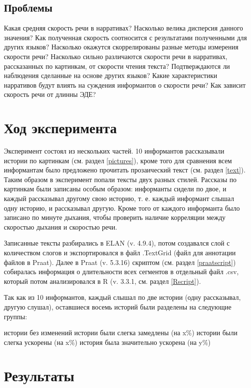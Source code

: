\subsection{Проблемы}
\begin{itemize}
\mytem Какая средняя скорость речи в нарративах? Насколько велика дисперсия данного значения? Как полученная скорость соотносится с результатами полученными для других языков?
\mytem Насколько окажутся скоррелированы разные методы измерения скорости речи?
\mytem Насколько сильно различаются скорости речи в нарративах, рассказанных по картинкам, от скорости чтения текста? Подтверждаются ли наблюдения сделанные на основе других языков?
\mytem Какие характеристики нарративов будут влиять на суждения информантов о скорости речи?
\mytem Как зависит скорость речи от длинны ЭДЕ?
\end{itemize}
\section{Ход эксперимента}
Эксперимент состоял из нескольких частей. 10 информантов рассказывали истории по картинкам (см. раздел \ref{pictures}), кроме того для сравнения всем информантам было предложено прочитать прозаический текст (см. раздел \ref{text}). Таким образом в эксперимент попали тексты двух разных стилей. Рассказы по картинкам были записаны особым образом: информанты сидели по двое, и каждый рассказывал другому свою историю, т. е. каждый информант слышал одну историю, и рассказывал другую. Кроме того от каждого информанта было записано по минуте дыхания, чтобы проверить наличие корреляции между скоростью дыхания и скоростью речи.
\par Записанные тексты разбирались в ELAN (v. 4.9.4), потом создавался слой с количеством слогов и экспортировался в файл .TextGrid (файл для аннотации файлов в Praat). Далее в Praat (v. 5.3.16) скриптом (см. раздел \ref{praatscript}) собиралась информация о длительности всех сегментов в отдельный файл .csv, который потом анализировался в R (v. 3.3.1, см. раздел \ref{Rscript}).
\par Так как из 10 информантов, каждый слышал по две истории (одну рассказывал, другую слушал), оставшиеся восемь историй были разделены на следующие группы:
\begin{itemize}
 истории без изменений
 истории были слегка замедлены (на x\%)
 истории были слегка ускорены (на x\%)
 история была значительно ускорена (на y\%)
\end{itemize}
\section{Результаты}
